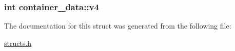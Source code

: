 \hypertarget{structcontainer__data_a22bd3b03c4df68b04ba4801762f47cd9}{
\subsubsection[{v4}]{\setlength{\rightskip}{0pt plus 5cm}int container\-\_\-data\-::v4}}\label{structcontainer__data_a22bd3b03c4df68b04ba4801762f47cd9}


The documentation for this struct was generated from the following file\-:\begin{DoxyCompactItemize}
\item 
\hyperlink{structs_8h}{structs.\-h}\end{DoxyCompactItemize}
